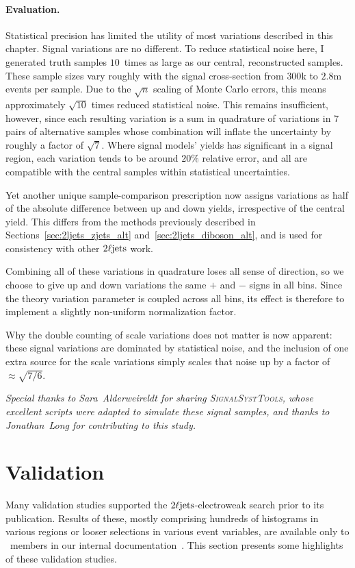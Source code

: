 \paragraph{Evaluation.}
Statistical precision has limited the utility of most variations described in
this chapter.
Signal variations are no different.
To reduce statistical noise here, I generated truth samples $10$~times as large
as our central, reconstructed samples.
These sample sizes vary roughly with the signal cross-section from $300$k to
$2.8$m events per sample.
Due to the $\sqrt{n}$ scaling of Monte Carlo errors, this means approximately
$\sqrt{10}$ times reduced statistical noise.
This remains insufficient, however, since each resulting variation is a
sum in quadrature of variations in $7$ pairs of alternative samples
whose combination will inflate the uncertainty by roughly a factor of
$\sqrt{7}$.
Where signal models' yields has significant in a signal region,
each variation tends to be around $20\%$ relative error,
and all are compatible with the central samples within statistical
uncertainties.

Yet another unique sample-comparison prescription now assigns variations as
half of the absolute difference between up and down yields, irrespective of the
central yield.
This differs from the methods previously described in
Sections~\ref{sec:2ljets_zjets_alt} and~\ref{sec:2ljets_diboson_alt},
and is used for consistency with other $2\ell\mathrm{jets}$ work.

Combining all of these variations in quadrature loses all sense of direction,
so we choose to give up and down variations the same $+$ and $-$ signs in all
bins.
Since the theory variation parameter is coupled across all bins, its effect is
therefore to implement a slightly non-uniform normalization factor.

Why the double counting of scale variations does not matter is now apparent:
these signal variations are dominated by statistical noise, and the inclusion
of one extra source for the scale variations simply scales that noise up by
a factor of $\approx \sqrt{7/6}$.

\emph{%
Special thanks to Sara~Alderweireldt for sharing \textsc{SignalSystTools},
whose excellent scripts were adapted to simulate these signal
samples, and thanks to Jonathan~Long for contributing to this study.
}

\section{Validation}
\label{sec:2ljets_validation}
Many validation studies supported the $2\ell\mathrm{jets}$-electroweak search prior to
its publication.
Results of these, mostly comprising hundreds of histograms in various regions
or looser selections in various event variables, are available only to \atlas\
members in our internal documentation~\cite{twoljets2018int}.
This section presents some highlights of these validation studies.

